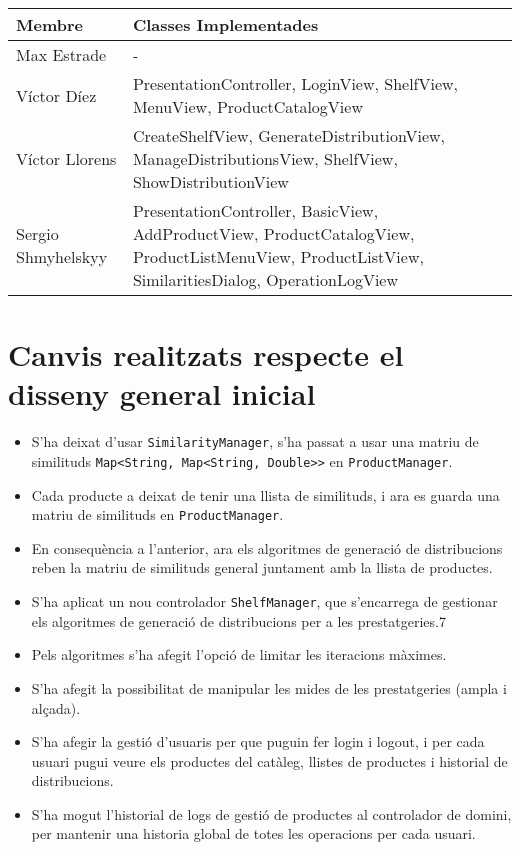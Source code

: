 \documentclass{article}
\begin{document}
\begin{longtable}{|>{\raggedright\arraybackslash}p{3cm}|>{\raggedright\arraybackslash}p{12cm}|}
\hline
\textbf{Membre} & \textbf{Classes Implementades} \\
\hline
Max Estrade & - \\
\hline
Víctor Díez & PresentationController, LoginView, ShelfView, MenuView, ProductCatalogView \\
\hline
Víctor Llorens & CreateShelfView, GenerateDistributionView, ManageDistributionsView, ShelfView, ShowDistributionView \\
\hline
Sergio Shmyhelskyy & PresentationController, BasicView, AddProductView, ProductCatalogView, ProductListMenuView, ProductListView, SimilaritiesDialog, OperationLogView \\
\hline
\end{longtable}

\section{Canvis realitzats respecte el disseny general inicial}

\begin{itemize}
    \item S'ha deixat d'usar \texttt{SimilarityManager}, s'ha passat a usar una matriu de similituds \texttt{Map<String, Map<String, Double>>} en \texttt{ProductManager}.
    \item Cada producte a deixat de tenir una llista de similituds, i ara es guarda una matriu de similituds en \texttt{ProductManager}.
    \item En consequència a l'anterior, ara els algoritmes de generació de distribucions reben la matriu de similituds general juntament amb la llista de productes.
    \item S'ha aplicat un nou controlador \texttt{ShelfManager}, que s'encarrega de gestionar els algoritmes de generació de distribucions per a les prestatgeries.7
    \item Pels algoritmes s'ha afegit l'opció de limitar les iteracions màximes.
    \item S'ha afegit la possibilitat de manipular les mides de les prestatgeries (ampla i alçada).
    \item S'ha afegir la gestió d'usuaris per que puguin fer login i logout, i per cada usuari pugui veure els productes del catàleg, llistes de productes i historial de distribucions.
    \item S'ha mogut l'historial de logs de gestió de productes al controlador de domini, per mantenir una historia global de totes les operacions per cada usuari.
\end{itemize}
\end{document}
